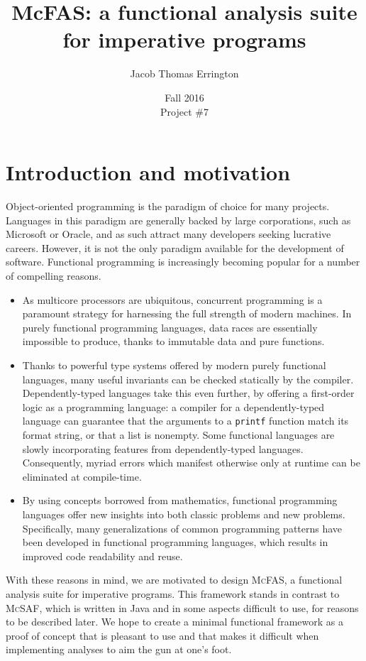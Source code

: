 \documentclass[letterpaper,11pt]{article}
\author{Jacob Thomas Errington}
\title{McFAS: a functional analysis suite for imperative programs}
\date{Fall 2016\\Project \#7}
\newcommand{\codesnip}{\texttt}
\newcommand{\mcfas}{\textsc{McFAS}}
\newcommand{\mcsaf}{\textsc{McSAF}}
\begin{document}
\maketitle

\section{Introduction and motivation}

Object-oriented programming is the paradigm of choice for many projects.
Languages in this paradigm are generally backed by large corporations, such as
Microsoft or Oracle, and as such attract many developers seeking lucrative
careers. However, it is not the only paradigm available for the development of
software. Functional programming is increasingly becoming popular for a number
of compelling reasons.

\begin{itemize}
  \item As multicore processors are ubiquitous, concurrent programming is a
    paramount strategy for harnessing the full strength of modern machines. In
    purely functional programming languages, data races are essentially
    impossible to produce, thanks to immutable data and pure functions.

  \item Thanks to powerful type systems offered by modern purely functional
    languages, many useful invariants can be checked statically by the
    compiler. Dependently-typed languages take this even further, by offering
    a first-order logic as a programming language: a compiler for a
    dependently-typed language can guarantee that the arguments to a
    \codesnip{printf} function match its format string, or that a list is
    nonempty. Some functional languages are slowly incorporating features from
    dependently-typed languages. Consequently, myriad errors which manifest
    otherwise only at runtime can be eliminated at compile-time.

  \item By using concepts borrowed from mathematics, functional programming
    languages offer new insights into both classic problems and new problems.
    Specifically, many generalizations of common programming patterns have been
    developed in functional programming languages, which results in improved
    code readability and reuse.
\end{itemize}

With these reasons in mind, we are motivated to design \mcfas{}, a functional
analysis suite for imperative programs. This framework stands in contrast to
\mcsaf{}, which is written in Java and in some aspects difficult to use, for
reasons to be described later. We hope to create a minimal functional framework
as a proof of concept that is pleasant to use and that makes it difficult when
implementing analyses to aim the gun at one's foot.
\end{document}
